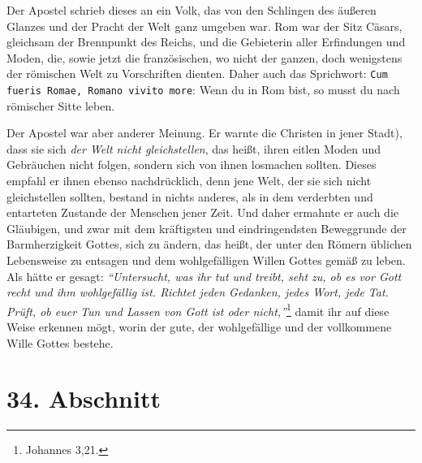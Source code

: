 \medskip

Der Apostel schrieb dieses an ein Volk, das von den Schlingen des äußeren
Glanzes
und der Pracht der Welt ganz umgeben war. Rom war der Sitz
Cäsars, gleichsam
der Brennpunkt des Reichs, und die Gebieterin aller Erfindungen und Moden, die,
sowie jetzt die französischen, wo nicht der ganzen, doch wenigstens der
römischen Welt zu Vorschriften dienten. Daher auch das Sprichwort: \texttt{Cum
fueris Romae, Romano vivito more}: Wenn du in Rom bist, so
musst
du nach römischer Sitte leben.

\medskip

Der Apostel war aber anderer Meinung. Er warnte
die Christen in jener
Stadt), dass sie sich \textit{der Welt nicht gleichstellen}, das heißt, ihren
eitlen
Moden
und Gebräuchen nicht folgen, sondern sich von ihnen losmachen sollten.
Dieses empfahl er ihnen ebenso nachdrücklich, denn jene Welt, der sie sich
nicht gleichstellen sollten, bestand in nichts anderes, als in dem verderbten
und
entarteten Zustande der Menschen jener Zeit. Und daher ermahnte er auch die
Gläubigen, und zwar mit dem kräftigsten und eindringendsten Beweggrunde der
Barmherzigkeit Gottes, sich zu ändern, das heißt, der unter den Römern üblichen
Lebensweise zu entsagen und dem wohlgefälligen Willen Gottes gemäß zu leben.
Als hätte er gesagt:
\textit{"`Untersucht, was ihr tut und treibt, seht zu, ob es vor
Gott recht und ihm wohlgefällig ist. Richtet jeden Gedanken, jedes Wort, jede
Tat. Prüft, ob euer Tun und Lassen von Gott ist oder nicht,"'}\footnote{Johannes
3,21.}
damit ihr auf diese Weise erkennen mögt, worin der gute, der
wohlgefällige und der vollkommene Wille Gottes bestehe.

\section{34. Abschnitt} \label{kap9_ab34}

